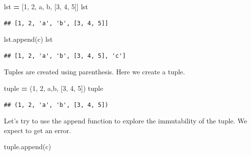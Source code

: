 \documentclass[
]{book}
\newenvironment{Shaded}{\begin{snugshade}}{\end{snugshade}}
\newcommand{\BuiltInTok}[1]{#1}
\newcommand{\DecValTok}[1]{\textcolor[rgb]{0.00,0.00,0.81}{#1}}
\newcommand{\NormalTok}[1]{#1}
\newcommand{\OperatorTok}[1]{\textcolor[rgb]{0.81,0.36,0.00}{\textbf{#1}}}
\newcommand{\StringTok}[1]{\textcolor[rgb]{0.31,0.60,0.02}{#1}}
\begin{document}
\begin{Shaded}
\begin{Highlighting}[]
\NormalTok{lst }\OperatorTok{=}\NormalTok{ [}\DecValTok{1}\NormalTok{, }\DecValTok{2}\NormalTok{, }\StringTok{\textquotesingle{}a\textquotesingle{}}\NormalTok{, }\StringTok{\textquotesingle{}b\textquotesingle{}}\NormalTok{, [}\DecValTok{3}\NormalTok{, }\DecValTok{4}\NormalTok{, }\DecValTok{5}\NormalTok{]]}
\NormalTok{lst }
\end{Highlighting}
\end{Shaded}

\begin{verbatim}
## [1, 2, 'a', 'b', [3, 4, 5]]
\end{verbatim}

\begin{Shaded}
\begin{Highlighting}[]
\NormalTok{lst.append(}\StringTok{\textquotesingle{}c\textquotesingle{}}\NormalTok{)}
\NormalTok{lst}
\end{Highlighting}
\end{Shaded}

\begin{verbatim}
## [1, 2, 'a', 'b', [3, 4, 5], 'c']
\end{verbatim}

Tuples are created using parenthesis. Here we create a tuple.

\begin{Shaded}
\begin{Highlighting}[]
\BuiltInTok{tuple} \OperatorTok{=}\NormalTok{ (}\DecValTok{1}\NormalTok{, }\DecValTok{2}\NormalTok{, }\StringTok{\textquotesingle{}a\textquotesingle{}}\NormalTok{,}\StringTok{\textquotesingle{}b\textquotesingle{}}\NormalTok{, [}\DecValTok{3}\NormalTok{, }\DecValTok{4}\NormalTok{, }\DecValTok{5}\NormalTok{])}
\BuiltInTok{tuple} 
\end{Highlighting}
\end{Shaded}

\begin{verbatim}
## (1, 2, 'a', 'b', [3, 4, 5])
\end{verbatim}

Let's try to use the append function to explore the immutability of the tuple. We expect to get an error.

\begin{Shaded}
\begin{Highlighting}[]
\BuiltInTok{tuple}\NormalTok{.append(}\StringTok{\textquotesingle{}c\textquotesingle{}}\NormalTok{)}
\end{Highlighting}
\end{Shaded}
\end{document}
